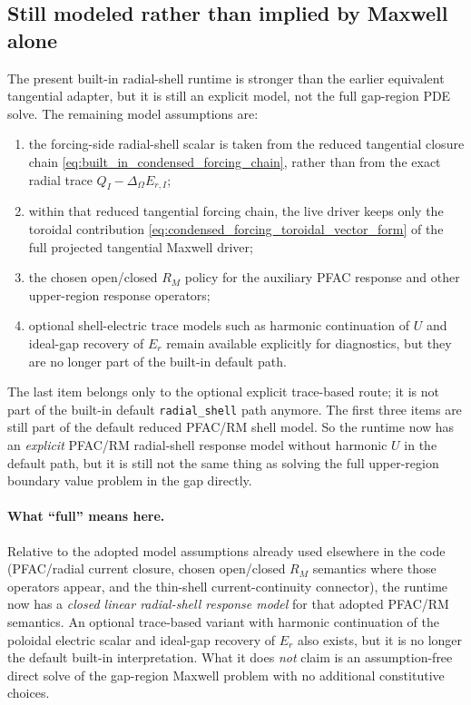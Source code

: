 \documentclass[11pt,a4paper]{article}
\begin{document}
\subsection*{Still modeled rather than implied by Maxwell alone}

The present built-in radial-shell runtime is stronger than the earlier
equivalent tangential adapter, but it is still an explicit model, not the full
gap-region PDE solve. The remaining model assumptions are:
\begin{enumerate}
\item the forcing-side radial-shell scalar is taken from the reduced
tangential closure chain \eqref{eq:built_in_condensed_forcing_chain}, rather
than from the exact radial trace \(Q_I-\Delta_\Omega E_{r,I}\);
\item within that reduced tangential forcing chain, the live driver keeps only
the toroidal contribution
\eqref{eq:condensed_forcing_toroidal_vector_form} of the full projected
tangential Maxwell driver;
\item the chosen open/closed $R_M$ policy for the auxiliary PFAC response and
other upper-region response operators;
\item optional shell-electric trace models such as harmonic continuation of
\(U\) and ideal-gap recovery of \(E_r\) remain available explicitly for
diagnostics, but they are no longer part of the built-in default path.
\end{enumerate}

The last item belongs only to the optional explicit trace-based route; it is
not part of the built-in default \texttt{radial\_shell} path anymore. The
first three items are still part of the default reduced PFAC/RM shell model.
So the runtime now has an \emph{explicit} PFAC/RM radial-shell response model
without harmonic \(U\) in the default path, but it is still not the same thing
as solving the full upper-region boundary value problem in the gap directly.

\paragraph{What ``full'' means here.}
Relative to the adopted model assumptions already used elsewhere in the code
(PFAC/radial current closure, chosen open/closed $R_M$ semantics where those
operators appear, and the thin-shell current-continuity connector), the runtime now
has a \emph{closed linear radial-shell response model} for that adopted
PFAC/RM semantics. An optional trace-based variant with harmonic continuation of the
poloidal electric scalar and ideal-gap recovery of $E_r$ also exists, but it
is no longer the default built-in interpretation.
What it does \emph{not} claim
is an assumption-free direct solve of the gap-region Maxwell problem with no
additional constitutive choices.
\end{document}
